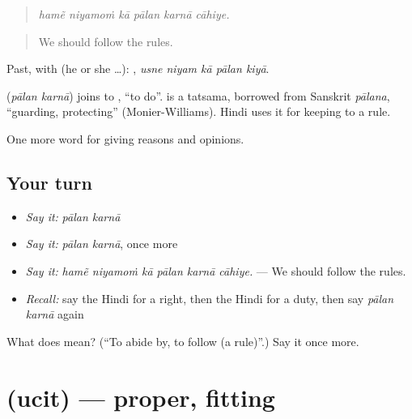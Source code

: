 \begin{quote}
     
\end{quote}

\begin{quote}
\emph{hamẽ niyamoṁ kā pālan karnā cāhiye.}
\end{quote}

\begin{quote}
We should follow the rules.
\end{quote}

Past, with  (he or she …):     , \emph{usne niyam kā pālan kiyā}.

\begin{cousinweb}
\textbf{ } (\emph{pālan karnā}) joins  to , \textquotedblleft{}to do\textquotedblright{}.  is a tatsama, borrowed from Sanskrit \emph{pālana}, \textquotedblleft{}guarding, protecting\textquotedblright{} (Monier-Williams). Hindi uses it for keeping to a rule.
\end{cousinweb}

\begin{grammarlens}[title={What you've built}]
One more word for giving reasons and opinions.
\end{grammarlens}

\subsection*{Your turn}
\begin{itemize}
\raggedright
  \item \emph{Say it:} \emph{pālan karnā}
  \item \emph{Say it:} \emph{pālan karnā}, once more
  \item \emph{Say it:} \emph{hamẽ niyamoṁ kā pālan karnā cāhiye.} — We should follow the rules.
  \item \emph{Recall:} say the Hindi for a right, then the Hindi for a duty, then say \emph{pālan karnā} again
\end{itemize}

\begin{tcolorbox}[breakable,colback=teal!4,colframe=teal!35!black,title={Before you move on}]
What does   mean? (\textquotedblleft{}To abide by, to follow (a rule)\textquotedblright{}.) Say it once more.
\end{tcolorbox}
\section[\texorpdfstring{\hi{उचित} (ucit)}{उचित (ucit)}]{ (ucit) — proper, fitting}

